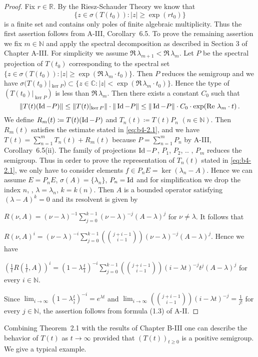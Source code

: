 \begin{proof}
	Fix $r \in \mathbb{R}$.
	By the Riesz-Schauder Theory we know that
	\[
    \{z \in \sigma(T(t_{0})) \colon |z| \geq \exp(rt_{0})\}
    \]
    is a finite set and contains only
	poles of finite algebraic multiplicity.
	Thus the first assertion
	follows from A-III, Corollary~6.5.
	To prove the remaining assertion we fix $m \in \mathbb{N}$ and apply the spectral
	decomposition as described in Section 3 of Chapter A-III.
	For simplicity we assume $\Re\,\lambda_{m+1} < \Re\,  \lambda_m$.
	Let $P$ be the spectral projection
	of $T(t_{0})$ corresponding to the spectral set $\{z \in \sigma(T(t_{0})) :
	|z| \geq \exp(\Re\,\lambda_m \cdot t_{0})\}$.
	Then $P$ reduces the semigroup and we have
	$\sigma(T(t_{0})|_{\ker P}) \subset \{z \in \mathbb{C} \colon |z| < \exp(\Re\,\lambda_m \cdot t_{0})\}$.
	Hence the type of
	$(T(t_{0})|_{\ker P})$ is less than $\Re\,\lambda_m$.
	Then there exists a constant $C_{0}$
	such that
\[
\|T(t)(\operatorname{Id} -P)\| \leq \|T(t)|_{\ker P}\|\cdot\|\operatorname{Id} -P\| \leq \|\operatorname{Id} -P\|\cdot C_{0} \cdot \exp(\mathop{}\!\mathrm{Re}\,\,\lambda_m \cdot t)\,.
\]
We define $R_m(t)  \coloneq  T(t)(\operatorname{Id} -P)$ and $T_n(t)  \coloneq  T(t)P_n$ $(n \in \mathbb{N})$.
Then $R_m(t)$ satisfies the estimate stated in \eqref{eq:b4-2.1}, and we have $T(t) =
\sum_{n=1}^m T_n(t) + R_m(t)$ because $P = \sum_{n=1}^m P_n$ by A-III, Corollary~6.5(ii).
The family of projections $\operatorname{Id} -P$, $P_1$, $P_2$, .. , $P_m$ reduces the semigroup.
Thus in order to prove the representation of $T_n(t)$ stated in
\eqref{eq:b4-2.1}, we only have to consider elements $f \in P_n E = \ker(\lambda_n-A)$.
Hence we can assume $E = P_n E$, $\sigma(A) = \{\lambda_n\}$, $P_n = \operatorname{Id} $ and for simplification
we drop the index $n$, \ie, $\lambda = \lambda_n$, $k = k(n)$.
Then $A$ is a bounded operator satisfying $(\lambda - A)^k = 0$ and its resolvent is given by

$R(\nu,A) = (\nu-\lambda)^{-1}\sum_{j=0}^{k-1}(\nu-\lambda)^{-j}(A-\lambda)^j$ for $\nu \neq \lambda$.
It follows that

$R(\nu,A)^i = (\nu-\lambda)^{-i}\sum_{j=0}^{k-1}(\binom{j+i-1}{i-1})(\nu-\lambda)^{-j}(A-\lambda)^j$.
Hence we have

$(\frac{1}{t}R(\frac{1}{t},A))^i = (1-\lambda\frac{t}{1})^{-i}\sum_{j=0}^{k-1}(\binom{j+i-1}{i-1})(i-\lambda t)^{-j}t^j(A-\lambda)^j$ for every $i \in \mathbb{N}$.

Since $\lim_{i\to\infty}(1-\lambda\frac{t}{i})^{-i} = e^{\lambda t}$ and $\lim_{i\to\infty}(\binom{j+i-1}{i-1})(i-\lambda t)^{-j} = \frac{1}{j!}$ for
every $j \in \mathbb{N}$, the assertion follows from formula (1.3) of A-II.
\end{proof}
Combining Theorem~2.1 with the results of Chapter B-III one can describe
the behavior of $T(t)$ as $t \to \infty$ provided that $(T(t))_{t \geq 0}$ is a
positive semigroup.
We give a typical example.

